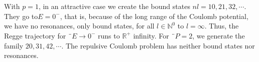 \\\\
With $p = 1$, in an attractive case we create the bound states $nl = 10, 21, 32, \cdots$. They go to$ E = 0^-$, that is, because of the long range of the Coulomb potential, we have no resonances, only bound states, for all $l\in\mathbb{N}^0$ to $l = \infty$. Thus, the Regge trajectory for $¨E \rightarrow 0^-$ runs to $\mathbb{R}^+$ infinity. For $¨P = 2$, we generate the family $20, 31, 42, \cdots$. The repulsive Coulomb problem has neither bound states nor resonances.